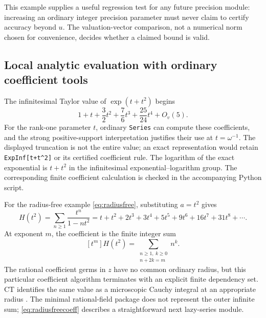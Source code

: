 \documentclass[11pt,letterpaper]{article}
\theoremstyle{definition}\newtheorem{definition}[theorem]{Definition}
\theoremstyle{remark}\newtheorem{remark}[theorem]{Remark}
\newcommand{\code}[1]{\texttt{#1}}
\numberwithin{equation}{section}\setcounter{tocdepth}{2}
\begin{document}
This example supplies a useful regression test for any future precision module: increasing an ordinary integer precision parameter must never claim to certify accuracy beyond $u$. The valuation-vector comparison, not a numerical norm chosen for convenience, decides whether a claimed bound is valid.

\subsection{Local analytic evaluation with ordinary coefficient tools}
The infinitesimal Taylor value of $\exp(t+t^2)$ begins
\begin{equation}\label{eq:expseriesexample}
 1+t+\frac32t^2+\frac76t^3+\frac{25}{24}t^4+O_v(5).
\end{equation}
For the rank-one parameter $t$, ordinary \code{Series} can compute these coefficients, and the strong positive-support interpretation justifies their use at $t=\omega^{-1}$. The displayed truncation is not the entire value; an exact representation would retain \code{ExpInf[t+t\^{}2]} or its certified coefficient rule. The logarithm of the exact exponential is $t+t^2$ in the infinitesimal exponential--logarithm group. The corresponding finite coefficient calculation is checked in the accompanying Python script.

For the radius-free example \eqref{eq:radiusfree}, substituting $a=t^2$ gives
\begin{equation}\label{eq:radiusfreesubstitution}
 H(t^2)=\sum_{n\ge1}\frac{t^n}{1-nt^2}
 =t+t^2+2t^3+3t^4+5t^5+9t^6+16t^7+31t^8+\cdots.
\end{equation}
At exponent $m$, the coefficient is the finite integer sum
\begin{equation}\label{eq:radiusfreecoeff}
 [t^m]H(t^2)=
 \sum_{\substack{n\ge1,\ k\ge0\\n+2k=m}}n^k.
\end{equation}
The rational coefficient germs in $z$ have no common ordinary radius, but this particular coefficient algorithm terminates with an explicit finite dependency set. CT identifies the same value as a microscopic Cauchy integral at an appropriate radius \cite{CT}. The minimal rational-field package does not represent the outer infinite sum; \eqref{eq:radiusfreecoeff} describes a straightforward next lazy-series module.
\end{document}
